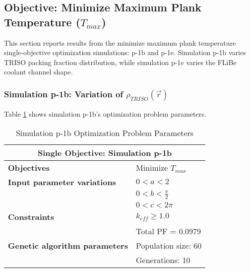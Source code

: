 \subsection{Objective: Minimize Maximum Plank Temperature ($T_{max}$)}
\label{sec:plank-1-obj-temp}
This section reports results from the minimize maximum plank temperature single-objective
optimization simulations: p-1b and p-1e. 
Simulation p-1b varies \gls{TRISO} packing fraction distribution, while simulation p-1e 
varies the \gls{FLiBe} coolant channel shape. 

\subsubsection{Simulation p-1b: Variation of $\rho_{TRISO}(\vec{r})$}
Table \ref{tab:simulationp1b} shows simulation p-1b's optimization problem parameters. 
\begin{table}[htbp!]
    \centering
    \onehalfspacing
    \caption{Simulation p-1b Optimization Problem Parameters}
	\label{tab:simulationp1b}
    \footnotesize
    \begin{tabular}{l|p{3cm}}
    \hline 
    \multicolumn{2}{c}{\textbf{Single Objective: Simulation p-1b}} \\
    \hline 
    \textbf{Objectives} & Minimize $T_{max}$ \\
    \hline 
    \textbf{Input parameter variations} & $0<a<2$ \\
    & $0<b<\frac{\pi}{2}$ \\
    & $0<c<2\pi$ \\
    \hline
    \textbf{Constraints} & $k_{eff} \geq 1.0$\\ 
    & Total PF = 0.0979\\
    \hline 
    \textbf{Genetic algorithm parameters} & Population size: 60 \\
    & Generations: 10 \\
    \hline
    \end{tabular}
\end{table}

